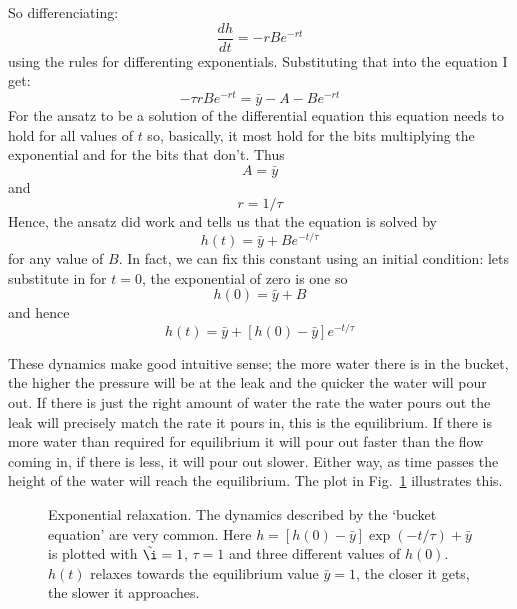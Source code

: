 \documentclass{article}
\begin{document}
So differenciating:
\begin{equation}
  \frac{dh}{dt}=-rBe^{-rt}
\end{equation}
using the rules for differenting exponentials. Substituting that into the equation I get:
\begin{equation}
  -\tau r Be^{-rt} = \bar{y}-A-Be^{-rt}
\end{equation}
For the ansatz to be a solution of the differential equation this
equation needs to hold for all values of $t$ so, basically, it most
hold for the bits multiplying the exponential and for the bits that
don't. Thus
\begin{equation}
  A=\bar{y}
\end{equation}
and
\begin{equation}
  r=1/\tau
\end{equation}
Hence, the ansatz did work and tells us that the equation is solved by
\begin{equation}
  h(t)=\bar{y}+Be^{-t/\tau}
\end{equation}
for any value of $B$. In fact, we can fix this constant using an
initial condition: lets substitute in for $t=0$, the exponential of
zero is one so
\begin{equation}
  h(0)=\bar{y}+B
\end{equation}
and hence
\begin{equation}
  h(t)=\bar{y}+[h(0)-\bar{y}]e^{-t/\tau}
\end{equation}


These dynamics make good intuitive sense; the more water there is in
the bucket, the higher the pressure will be at the leak and the
quicker the water will pour out. If there is just the right amount of
water the rate the water pours out the leak will precisely match the
rate it pours in, this is the equilibrium. If there is more water than
required for equilibrium it will pour out faster than the flow coming
in, if there is less, it will pour out slower. Either way, as time
passes the height of the water will reach the equilibrium. The plot in
Fig.~\ref{bucket_v} illustrates this.

\begin{figure}
\begin{center}

\end{center}
\caption{Exponential relaxation. The dynamics described by the
  \lq{}bucket equation\rq{} are very common. Here
  $h=[h(0)-\bar{y}]\exp(-t/\tau)+\bar{y}$ is plotted with
  $\tilde{\i}=1$, $\tau=1$ and three different values of
  $h(0)$. $h(t)$ relaxes towards the equilibrium value $\bar{y}=1$,
  the closer it gets, the slower it approaches.\label{bucket_v}}
\end{figure}
\end{document}
